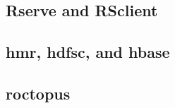 \documentclass[a4paper,10pt]{article}
\begin{document}

\subsection{Rserve and RSclient}


\subsection{hmr, hdfsc, and hbase}


\subsection{roctopus}


\printbibliography
\end{document}
